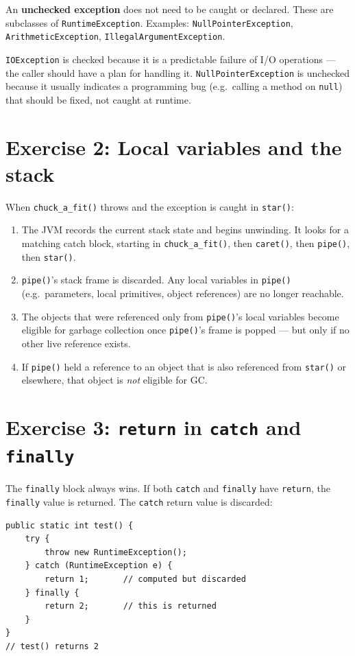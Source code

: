 \documentclass[twoside=false,DIV=14]{scrartcl}
\begin{document}
An \textbf{unchecked exception} does not need to be caught or declared.  These are subclasses of \texttt{RuntimeException}.  Examples: \texttt{NullPointerException}, \texttt{ArithmeticException}, \texttt{IllegalArgumentException}.

\texttt{IOException} is checked because it is a predictable failure of I/O operations --- the caller should have a plan for handling it.  \texttt{NullPointerException} is unchecked because it usually indicates a programming bug (e.g.\ calling a method on \texttt{null}) that should be fixed, not caught at runtime.

\section*{Exercise 2: Local variables and the stack}

When \texttt{chuck\_a\_fit()} throws and the exception is caught in \texttt{star()}:

\begin{enumerate}
\item The JVM records the current stack state and begins unwinding.  It looks for a matching catch block, starting in \texttt{chuck\_a\_fit()}, then \texttt{caret()}, then \texttt{pipe()}, then \texttt{star()}.
\item \texttt{pipe()}'s stack frame is discarded.  Any local variables in \texttt{pipe()} (e.g.\ parameters, local primitives, object references) are no longer reachable.
\item The objects that were referenced only from \texttt{pipe()}'s local variables become eligible for garbage collection once \texttt{pipe()}'s frame is popped --- but only if no other live reference exists.
\item If \texttt{pipe()} held a reference to an object that is also referenced from \texttt{star()} or elsewhere, that object is \emph{not} eligible for GC.
\end{enumerate}

\section*{Exercise 3: \texttt{return} in \texttt{catch} and \texttt{finally}}

The \texttt{finally} block always wins.  If both \texttt{catch} and \texttt{finally} have \texttt{return}, the \texttt{finally} value is returned.  The \texttt{catch} return value is discarded:

\begin{lstlisting}
public static int test() {
    try {
        throw new RuntimeException();
    } catch (RuntimeException e) {
        return 1;       // computed but discarded
    } finally {
        return 2;       // this is returned
    }
}
// test() returns 2
\end{lstlisting}
\end{document}
